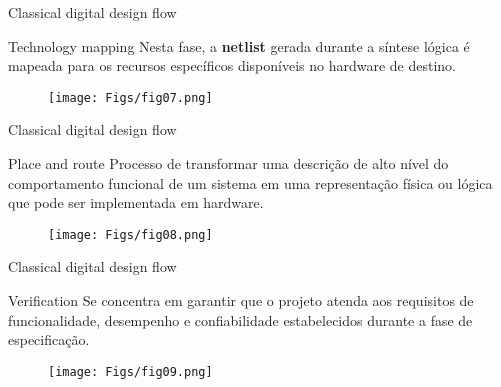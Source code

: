 \documentclass[aspectratio=169]{beamer}
\begin{document}
\begin{frame}{Classical digital design flow}
	
	\begin{block}{Technology mapping}
		\justifying
		Nesta fase, a \textbf{netlist} gerada durante a síntese lógica é mapeada para os recursos específicos disponíveis no hardware de destino.
	\end{block}		
	
	\begin{figure}[h]
		\centering
		\texttt{[image: Figs/fig07.png]}
	\end{figure}
	
\end{frame}


\begin{frame}{Classical digital design flow}
	
	
	\begin{block}{Place and route}
		\justifying
		Processo de transformar uma descrição de alto nível do comportamento funcional de um sistema em uma representação física ou lógica que pode ser implementada em hardware.
	\end{block}	
	
	\begin{figure}[h]
		\centering
		\texttt{[image: Figs/fig08.png]}
	\end{figure}

	
\end{frame}

\begin{frame}{Classical digital design flow}

	\begin{block}{Verification}
		\justifying
		Se concentra em garantir que o projeto atenda aos requisitos de funcionalidade, desempenho e confiabilidade estabelecidos durante a fase de especificação.
	\end{block}		
	
	\begin{figure}[h]
		\centering
		\texttt{[image: Figs/fig09.png]}
	\end{figure}
	
\end{frame}
\end{document}
